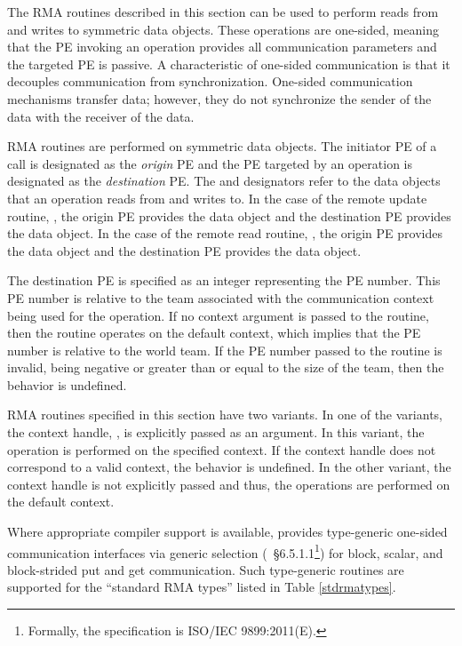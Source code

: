 The \ac{RMA} routines described in this section can be used to perform
reads from and writes to symmetric data objects. These operations
are one-sided, meaning that the \ac{PE} invoking an operation provides all
communication parameters and the targeted \ac{PE} is passive. A characteristic
of one-sided communication is that it decouples communication from
synchronization. One-sided communication mechanisms transfer data; however,
they do not synchronize the sender of the data with the receiver of the data.

\openshmem \ac{RMA} routines are performed on symmetric data objects.  The
initiator \ac{PE} of a call is designated as the \emph{origin} \ac{PE} and the
\ac{PE} targeted by an operation is designated as the \emph{destination} \ac{PE}.  The
\source{} and \dest{} designators refer to the data objects that an operation
reads from and writes to.  In the case of the remote update routine, \PUT{},
the origin \ac{PE} provides the \source{} data object and the destination
\ac{PE} provides the \dest{} data object. In the case of the remote read
routine, \GET{}, the origin \ac{PE} provides the \dest{} data object and the
destination \ac{PE} provides the \source{} data object.

The destination \ac{PE} is specified as an integer representing the \ac{PE} number.
This \ac{PE} number is relative to the team associated with the
communication context being used for the operation. If no context argument is passed to the routine,
then the routine operates on the default context, which implies that
the \ac{PE} number is relative to the world team.
If the \ac{PE} number passed to the routine is invalid, being negative
or greater than or equal to the size of the \openshmem team, then the behavior is undefined.

\openshmem \ac{RMA} routines specified in this section have two variants. In
one of the variants, the context handle, , is explicitly passed as
an argument. In this variant, the operation is performed on the specified
context. If the context handle  does not correspond to a valid
context, the behavior is undefined. In the other variant, the context handle
is not explicitly passed and thus, the operations are performed on the
default context.

Where appropriate compiler support is available, \openshmem provides type-generic
one-sided communication interfaces via \Cstd[11] generic selection
(\Cstd[11]~\S6.5.1.1\footnote{Formally, the \Cstd[11] specification is ISO/IEC 9899:2011(E).})
for block, scalar, and block-strided put and get communication.
Such type-generic routines are supported for the ``standard \ac{RMA} types''
listed in Table \ref{stdrmatypes}.

